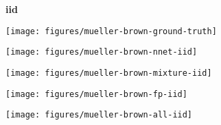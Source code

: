 \begin{figure}
    \begin{minipage}{\textwidth}
        \begin{subfigure}[c]{0.1\textwidth}
            \textbf{iid}
        \end{subfigure}
        \begin{subfigure}[c]{0.17\textwidth}
            \centering
            \texttt{[image: figures/mueller-brown-ground-truth]}
        \end{subfigure}
        \begin{subfigure}[c]{0.17\textwidth}
            \centering
            \texttt{[image: figures/mueller-brown-nnet-iid]}
        \end{subfigure}
        \begin{subfigure}[c]{0.17\textwidth}
            \centering
            \texttt{[image: figures/mueller-brown-mixture-iid]}
        \end{subfigure}
        \begin{subfigure}[c]{0.17\textwidth}
            \centering
            \texttt{[image: figures/mueller-brown-fp-iid]}
        \end{subfigure}
        \begin{subfigure}[c]{0.17\textwidth}
            \centering
            \texttt{[image: figures/mueller-brown-all-iid]}
        \end{subfigure}
    \end{minipage}


\end{figure}
